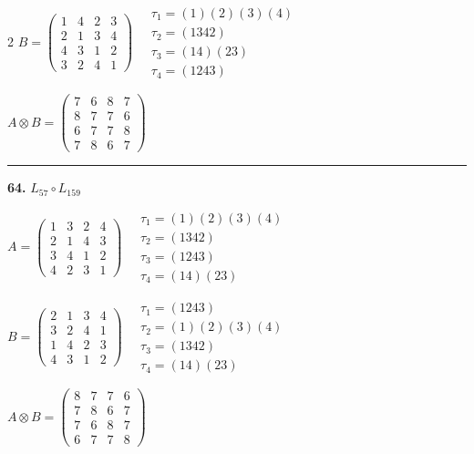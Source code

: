 \begin{multicols}{2}
$B = \begin{pmatrix} 1 & 4 & 2 & 3 \\ 2 & 1 & 3 & 4 \\ 4 & 3 & 1 & 2 \\ 3 & 2 & 4 & 1 \end{pmatrix} \quad \begin{matrix} \tau_{1}=(1)(2)(3)(4) \\ \tau_{2}=(1 3 4 2) \\ \tau_{3}=(1 4)(2 3) \\ \tau_{4}=(1 2 4 3) \end{matrix}$

$A \otimes B = \begin{pmatrix} 7 & 6 & 8 & 7 \\ 8 & 7 & 7 & 6 \\ 6 & 7 & 7 & 8 \\ 7 & 8 & 6 & 7 \end{pmatrix}$

\vspace{0.3em}
\hrule
\vspace{0.3em}

\noindent\textbf{64.} $L_{57} \circ L_{159}$

$A = \begin{pmatrix} 1 & 3 & 2 & 4 \\ 2 & 1 & 4 & 3 \\ 3 & 4 & 1 & 2 \\ 4 & 2 & 3 & 1 \end{pmatrix} \quad \begin{matrix} \tau_{1}=(1)(2)(3)(4) \\ \tau_{2}=(1 3 4 2) \\ \tau_{3}=(1 2 4 3) \\ \tau_{4}=(1 4)(2 3) \end{matrix}$

$B = \begin{pmatrix} 2 & 1 & 3 & 4 \\ 3 & 2 & 4 & 1 \\ 1 & 4 & 2 & 3 \\ 4 & 3 & 1 & 2 \end{pmatrix} \quad \begin{matrix} \tau_{1}=(1 2 4 3) \\ \tau_{2}=(1)(2)(3)(4) \\ \tau_{3}=(1 3 4 2) \\ \tau_{4}=(1 4)(2 3) \end{matrix}$

$A \otimes B = \begin{pmatrix} 8 & 7 & 7 & 6 \\ 7 & 8 & 6 & 7 \\ 7 & 6 & 8 & 7 \\ 6 & 7 & 7 & 8 \end{pmatrix}$


\end{multicols}
